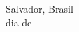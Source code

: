 \begin{agradecimentos}







\ \\
\ \\

\noindent

\raggedright
Salvador, Brasil \\ 
dia de \mesdeano \\

\raggedleft
\theauthor\\ \theauthorr\\ \theauthorrr\\ \theauthorrrr\\

\end{agradecimentos}
